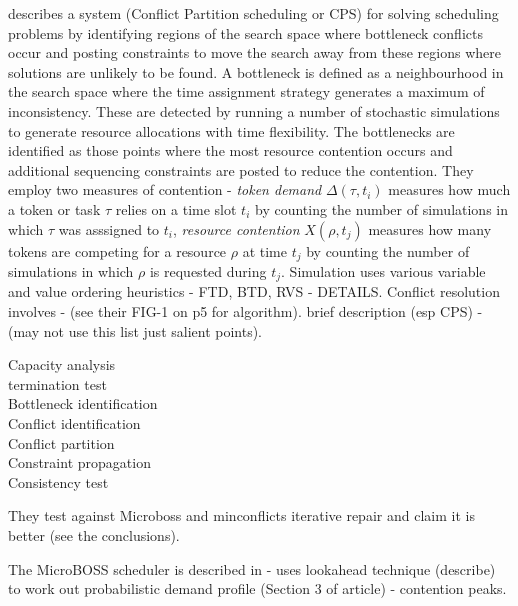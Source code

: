 \cite{muscettola92bottleneck} describes a system (Conflict Partition scheduling or CPS) for solving scheduling problems by identifying regions of the search space where bottleneck conflicts occur and posting constraints to move the search away from these regions where solutions are unlikely to be found. A bottleneck is defined as a neighbourhood in the search space where the time assignment strategy generates a maximum of inconsistency. These are detected by running a number of stochastic simulations to generate resource allocations with time flexibility. The bottlenecks are identified as those points where the most resource contention occurs and additional sequencing constraints are posted to reduce the contention. They employ two measures of contention - \emph{token demand} $\Delta(\tau,t_i)$ measures how much a token or task $\tau$ relies on a time slot $t_i$ by counting the number of simulations in which $\tau$ was asssigned to $t_i$, \emph{resource contention} $X(\rho,t_j)$ measures how many tokens are competing for a resource $\rho$ at time $t_j$ by counting the number of simulations in which $\rho$ is requested during $t_j$. Simulation uses various variable and value ordering heuristics - FTD, BTD, RVS - DETAILS. Conflict resolution involves - (see their FIG-1 on p5 for algorithm). brief description (esp CPS) - (may not use this list just salient points).
\begin{description}
\item[Capacity analysis]
\item[termination test]
\item[Bottleneck identification]
\item[Conflict identification]
\item[Conflict partition]
\item[Constraint propagation]
\item[Consistency test]
\end{description}

They test against Microboss \cite{sadeh91lookahead} and minconflicts iterative repair \cite{minton92minconflicts}and claim it is better (see the conclusions).


The MicroBOSS scheduler is described in \cite{sadeh91lookahead} - uses lookahead technique (describe) to work out probabilistic demand profile (Section 3 of article) - contention peaks. 

